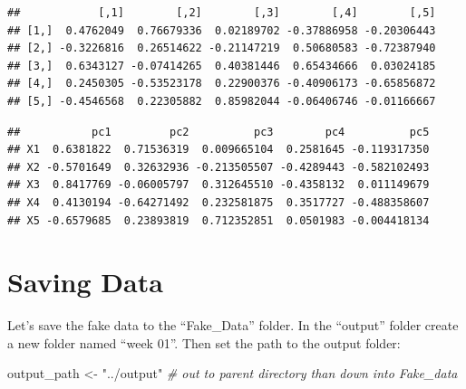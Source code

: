 \documentclass[]{book}
\newenvironment{Shaded}{\begin{snugshade}}{\end{snugshade}}
\newcommand{\KeywordTok}[1]{\textcolor[rgb]{0.13,0.29,0.53}{\textbf{#1}}}
\newcommand{\DecValTok}[1]{\textcolor[rgb]{0.00,0.00,0.81}{#1}}
\newcommand{\StringTok}[1]{\textcolor[rgb]{0.31,0.60,0.02}{#1}}
\newcommand{\CommentTok}[1]{\textcolor[rgb]{0.56,0.35,0.01}{\textit{#1}}}
\newcommand{\OperatorTok}[1]{\textcolor[rgb]{0.81,0.36,0.00}{\textbf{#1}}}
\newcommand{\NormalTok}[1]{#1}
\begin{document}
\begin{verbatim}
##            [,1]        [,2]        [,3]        [,4]        [,5]
## [1,]  0.4762049  0.76679336  0.02189702 -0.37886958 -0.20306443
## [2,] -0.3226816  0.26514622 -0.21147219  0.50680583 -0.72387940
## [3,]  0.6343127 -0.07414265  0.40381446  0.65434666  0.03024185
## [4,]  0.2450305 -0.53523178  0.22900376 -0.40906173 -0.65856872
## [5,] -0.4546568  0.22305882  0.85982044 -0.06406746 -0.01166667
\end{verbatim}

\begin{Shaded}
\end{Shaded}

\begin{verbatim}
##           pc1         pc2          pc3        pc4          pc5
## X1  0.6381822  0.71536319  0.009665104  0.2581645 -0.119317350
## X2 -0.5701649  0.32632936 -0.213505507 -0.4289443 -0.582102493
## X3  0.8417769 -0.06005797  0.312645510 -0.4358132  0.011149679
## X4  0.4130194 -0.64271492  0.232581875  0.3517727 -0.488358607
## X5 -0.6579685  0.23893819  0.712352851  0.0501983 -0.004418134
\end{verbatim}

\section{Saving Data}\label{saving-data}

Let's save the fake data to the ``Fake\_Data'' folder. In the ``output''
folder create a new folder named ``week 01''. Then set the path to the
output folder:

\begin{Shaded}
\begin{Highlighting}[]
\NormalTok{output_path <-}\StringTok{ "../output"} \CommentTok{# out to parent directory than down into Fake_data}
\end{Highlighting}
\end{Shaded}
\end{document}
